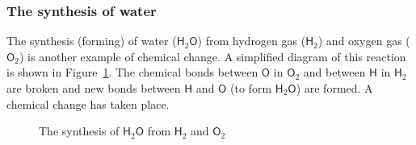 \subsubsection*{The synthesis of water}
\label{m38709*id62788}The synthesis (forming) of water ($\mathsf{H}_{2}\mathsf{O}$) from hydrogen gas ($\mathsf{H}_{2}$) and oxygen gas ($\mathsf{O}_{2}$) is another example of chemical change. A simplified diagram of this reaction is shown in Figure~\ref{fig:chemical change:synthesis}. The chemical bonds between $\mathsf{O}$ in $\mathsf{O}_{2}$ and between $\mathsf{H}$ in $\mathsf{H}_{2}$ are broken and new bonds between $\mathsf{H}$ and $\mathsf{O}$ (to form $\mathsf{H}_{2}\mathsf{O}$) are formed. A chemical change has taken place.\par 
    \setcounter{subfigure}{0}
\begin{figure}[h]
\begin{center}
\end{center}
\caption{The synthesis of $\mathsf{H}_{2}\mathsf{O}$ from $\mathsf{H}_{2}$ and $\mathsf{O}_{2}$}
\label{fig:chemical change:synthesis}
\end{figure} 
\label{m38709*secfhsst!!!underscore!!!id163}
